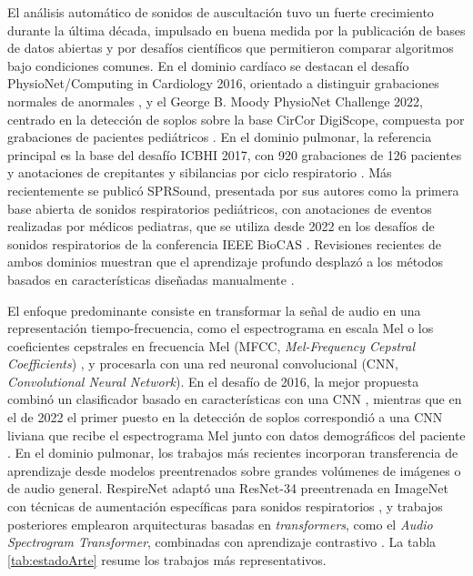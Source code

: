 El análisis automático de sonidos de auscultación tuvo un fuerte crecimiento durante la última
década, impulsado en buena medida por la publicación de bases de datos abiertas y por desafíos
científicos que permitieron comparar algoritmos bajo condiciones comunes. En el dominio cardíaco se
destacan el desafío PhysioNet/Computing in Cardiology 2016, orientado a distinguir grabaciones
normales de anormales \citep{clifford2016classification}, y el George B. Moody PhysioNet Challenge
2022, centrado en la detección de soplos \citep{reyna2023heart} sobre la base CirCor DigiScope,
compuesta por grabaciones de pacientes pediátricos \citep{oliveira2022circor}. En el dominio
pulmonar, la referencia principal es la base del desafío ICBHI 2017, con 920 grabaciones de 126
pacientes y anotaciones de crepitantes y sibilancias por ciclo respiratorio \citep{rocha2019open}.
Más recientemente se publicó SPRSound, presentada por sus autores como la primera base abierta de
sonidos respiratorios pediátricos, con anotaciones de eventos realizadas por médicos pediatras, que
se utiliza desde 2022 en los desafíos de sonidos respiratorios de la conferencia IEEE BioCAS
\citep{zhang2022sprsound}. Revisiones recientes de ambos dominios muestran que el aprendizaje
profundo desplazó a los métodos basados en características diseñadas manualmente
\citep{ren2024comprehensive, sfayyih2023review}.

El enfoque predominante consiste en transformar la señal de audio en una representación
tiempo-frecuencia, como el espectrograma en escala Mel o los coeficientes cepstrales en frecuencia
Mel (MFCC, \textit{Mel-Frequency Cepstral Coefficients}) \citep{davis1980comparison}, y procesarla
con una red neuronal convolucional (CNN, \textit{Convolutional Neural Network}). En el desafío de
2016, la mejor propuesta combinó un clasificador basado en características con una CNN
\citep{potes2016ensemble}, mientras que en el de 2022 el primer puesto en la detección de soplos
correspondió a una CNN liviana que recibe el espectrograma Mel junto con datos demográficos del
paciente \citep{lu2022lightweight}. En el dominio pulmonar, los trabajos más recientes incorporan
transferencia de aprendizaje desde modelos preentrenados sobre grandes volúmenes de imágenes o de
audio general. RespireNet adaptó una ResNet-34 preentrenada en ImageNet con técnicas de aumentación
específicas para sonidos respiratorios \citep{gairola2021respirenet}, y trabajos posteriores
emplearon arquitecturas basadas en \textit{transformers}, como el \textit{Audio Spectrogram
Transformer}, combinadas con aprendizaje contrastivo \citep{bae2023patchmix}. La tabla
\ref{tab:estadoArte} resume los trabajos más representativos.

